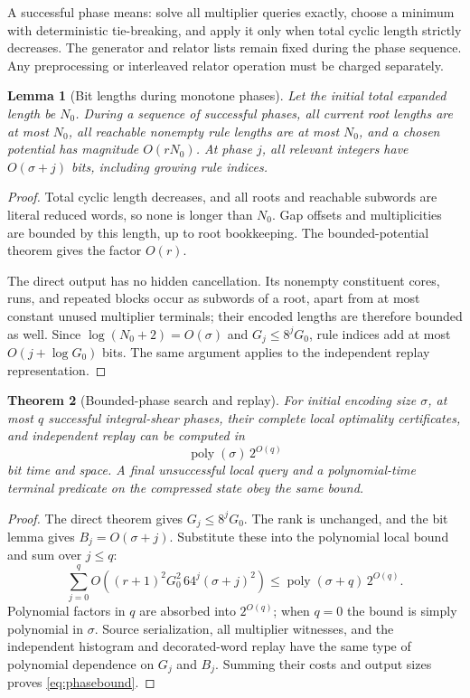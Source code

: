 \documentclass[11pt,letterpaper]{article}
\newtheorem{theorem}{Theorem}[section]
\newtheorem{lemma}[theorem]{Lemma}
\theoremstyle{definition}
\theoremstyle{remark}\newtheorem{remark}[theorem]{Remark}
\newcommand{\poly}{\operatorname{poly}}
\begin{document}
A successful phase means: solve all multiplier queries exactly, choose a
minimum with deterministic tie-breaking, and apply it only when total cyclic
length strictly decreases. The generator and relator lists remain fixed
during the phase sequence. Any preprocessing or interleaved relator operation
must be charged separately.

\begin{lemma}[Bit lengths during monotone phases]
Let the initial total expanded length be $N_0$. During a sequence of successful
phases, all current root lengths are at most $N_0$, all reachable nonempty
rule lengths are at most $N_0$, and a chosen potential has magnitude
$O(rN_0)$. At phase $j$, all relevant integers have
$O(\sigma+j)$ bits, including growing rule indices.
\end{lemma}
\begin{proof}
Total cyclic length decreases, and all roots and reachable subwords are
literal reduced words, so none is longer than $N_0$. Gap offsets and
multiplicities are bounded by this length, up to root bookkeeping. The
bounded-potential theorem gives the factor $O(r)$.

The direct output has no hidden cancellation. Its nonempty constituent cores,
runs, and repeated blocks occur as subwords of a root, apart from at most
constant unused multiplier terminals; their encoded lengths are therefore
bounded as well. Since $\log(N_0+2)=O(\sigma)$ and
$G_j\le8^jG_0$, rule indices add at most $O(j+\log G_0)$ bits. The same
argument applies to the independent replay representation.
\end{proof}

\begin{theorem}[Bounded-phase search and replay]
\label{thm:phase}
For initial encoding size $\sigma$, at most $q$ successful integral-shear
phases, their complete local optimality certificates, and independent replay
can be computed in
\begin{equation}
 \poly(\sigma)\,2^{O(q)}
 \label{eq:phasebound}
\end{equation}
bit time and space. A final unsuccessful local query and a polynomial-time
terminal predicate on the compressed state obey the same bound.
\end{theorem}
\begin{proof}
The direct theorem gives $G_j\le8^jG_0$. The rank is unchanged, and the bit
lemma gives $B_j=O(\sigma+j)$. Substitute these into the polynomial local
bound and sum over $j\le q$:
\[
 \sum_{j=0}^{q} O\!\left((r+1)^2G_0^2\,64^j(\sigma+j)^2\right)
   \le \poly(\sigma+q)\,2^{O(q)}.
\]
Polynomial factors in $q$ are absorbed into $2^{O(q)}$; when $q=0$ the bound
is simply polynomial in $\sigma$. Source serialization, all multiplier
witnesses, and the independent histogram and decorated-word replay have the
same type of polynomial dependence on $G_j$ and $B_j$. Summing their costs
and output sizes proves \eqref{eq:phasebound}.
\end{proof}
\end{document}
